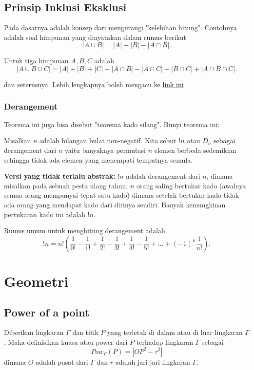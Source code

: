     \subsection{Prinsip Inklusi Eksklusi}
    Pada dasarnya adalah konsep dari mengurangi "kelebihan hitung". Contohnya adalah soal himpunan yang dinyatakan dalam rumus berikut
    $$|A \cup B|=|A|+|B|-|A \cap B|.$$
    
    Untuk tiga himpunan $A,B,C$ adalah
    $$|A \cup B \cup C|=|A|+|B|+|C|-|A \cap B|-|A \cap C|-|B \cap C|+|A \cap B \cap C|.$$
    
    dan seterusnya. Lebih lengkapnya boleh mengacu ke \href{https://brilliant.org/wiki/principle-of-inclusion-and-exclusion-pie/}{link ini}
    
    \subsubsection{Derangement}
    Teorema ini juga bisa disebut "teorema kado silang". Bunyi teorema ini:
    
    Misalkan $n$ adalah bilangan bulat non-negatif. Kita sebut $!n$ atau $D_n$ sebagai derangement dari $n$ yaitu banyaknya permutasi $n$ elemen berbeda sedemikian sehingga tidak ada elemen yang menempati tempatnya semula.
    
    \textbf{Versi yang tidak terlalu abstrak:} $!n$ adalah derangement dari $n$, dimana misalkan pada sebuah pesta ulang tahun, $n$ orang saling bertukar kado (awalnya semua orang mempunyai tepat satu kado) dimana setelah bertukar kado tidak ada orang yang mendapat kado dari dirinya sendiri. Banyak kemungkinan pertukaran kado ini adalah $!n$.
    
    Rumus umum untuk menghitung derangement adalah
    $$!n = n! \left(\dfrac{1}{0!}-\dfrac{1}{1!}+\dfrac{1}{2!}-\dfrac{1}{3!}+\dfrac{1}{4!}-\dfrac{1}{5!}+\dots+(-1)^n\dfrac{1}{n!}\right).$$
    
    
    
    \section{Geometri}
    
    \subsection{Power of a point}
    Diberikan lingkaran $\Gamma$ dan titik $P$ yang terletak di dalam atau di luar lingkaran $\Gamma$. Maka definisikan kuasa atau power dari $P$ terhadap lingkaran $\Gamma$ sebagai
    $$Pow_\Gamma (P) = |OP^2-r^2|$$
    dimana $O$ adalah pusat dari $\Gamma$ dan $r$ adalah jari-jari lingkaran $\Gamma$.
    
